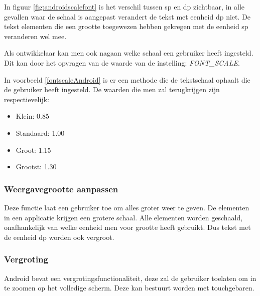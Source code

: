 In figuur \ref{fig:androidscalefont} is het verschil tussen sp en dp zichtbaar, in alle gevallen waar de schaal is aangepast verandert de tekst met eenheid dp niet. De tekst elementen die een grootte toegewezen hebben gekregen met de eenheid sp veranderen wel mee.



Als ontwikkelaar kan men ook nagaan welke schaal een gebruiker heeft ingesteld. Dit kan door het opvragen van de waarde van de instelling: \emph{FONT\_SCALE}.




In voorbeeld \ref{fontscaleAndroid} is er een methode die de tekstschaal ophaalt die de gebruiker heeft ingesteld.
De waarden die men zal terugkrijgen zijn respectievelijk:
\begin{itemize}
    \item Klein: 0.85
    \item Standaard: 1.00
    \item Groot: 1.15
    \item Grootst: 1.30
\end{itemize}


\subsubsection{Weergavegrootte aanpassen }
Deze functie laat een gebruiker toe om alles groter weer te geven. De elementen in een applicatie krijgen een grotere schaal. Alle elementen worden geschaald, onafhankelijk van welke eenheid men voor grootte heeft gebruikt. Dus tekst met de eenheid dp worden ook vergroot.

\subsubsection{Vergroting}
Android bevat een vergrotingsfunctionaliteit, deze zal de gebruiker toelaten om in te zoomen op het volledige scherm. Deze kan bestuurt worden met touchgebaren. 

